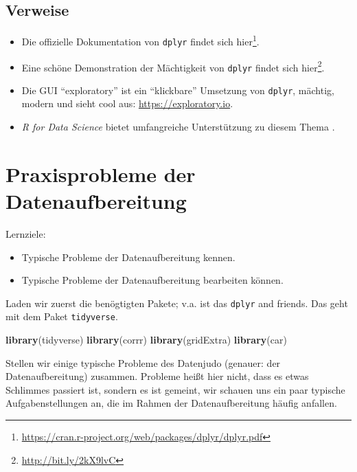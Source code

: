 \documentclass[12pt,ngerman,]{book}
\newenvironment{Shaded}{\begin{snugshade}}{\end{snugshade}}
\newcommand{\KeywordTok}[1]{\textcolor[rgb]{0.13,0.29,0.53}{\textbf{{#1}}}}
\newcommand{\NormalTok}[1]{{#1}}
\providecommand{\tightlist}{%
  \setlength{\itemsep}{0pt}\setlength{\parskip}{0pt}}
\let\rmarkdownfootnote\footnote%
\def\footnote{\protect\rmarkdownfootnote}
\renewenvironment{Shaded}{\begin{kframe}}{\end{kframe}}
\let\BeginKnitrBlock\begin \let\EndKnitrBlock\end
\begin{document}
\section{Verweise}\label{verweise-2}

\begin{itemize}
\item
  Die offizielle Dokumentation von \texttt{dplyr} findet sich
  hier\footnote{\url{https://cran.r-project.org/web/packages/dplyr/dplyr.pdf}}.
\item
  Eine schöne Demonstration der Mächtigkeit von \texttt{dplyr} findet
  sich hier\footnote{\url{http://bit.ly/2kX9lvC}}.
\item
  Die GUI ``exploratory'' ist ein ``klickbare'' Umsetzung von
  \texttt{dplyr}, mächtig, modern und sieht cool aus:
  \url{https://exploratory.io}.
\item
  \emph{R for Data Science} bietet umfangreiche Unterstützung zu diesem
  Thema \citep{r4ds}.
\end{itemize}

\chapter{Praxisprobleme der
Datenaufbereitung}\label{praxisprobleme-der-datenaufbereitung}

\BeginKnitrBlock{rmdcaution}
Lernziele:

\begin{itemize}
\tightlist
\item
  Typische Probleme der Datenaufbereitung kennen.
\item
  Typische Probleme der Datenaufbereitung bearbeiten können.
\end{itemize}
\EndKnitrBlock{rmdcaution}

Laden wir zuerst die benögtigten Pakete; v.a. ist das \texttt{dplyr} and
friends. Das geht mit dem Paket \texttt{tidyverse}.

\begin{Shaded}
\begin{Highlighting}[]
\KeywordTok{library}\NormalTok{(tidyverse)}
\KeywordTok{library}\NormalTok{(corrr)}
\KeywordTok{library}\NormalTok{(gridExtra)}
\KeywordTok{library}\NormalTok{(car)}
\end{Highlighting}
\end{Shaded}

Stellen wir einige typische Probleme des Datenjudo (genauer: der
Datenaufbereitung) zusammen. Probleme heißt hier nicht, dass es etwas
Schlimmes passiert ist, sondern es ist gemeint, wir schauen uns ein paar
typische Aufgabenstellungen an, die im Rahmen der Datenaufbereitung
häufig anfallen.
\end{document}
